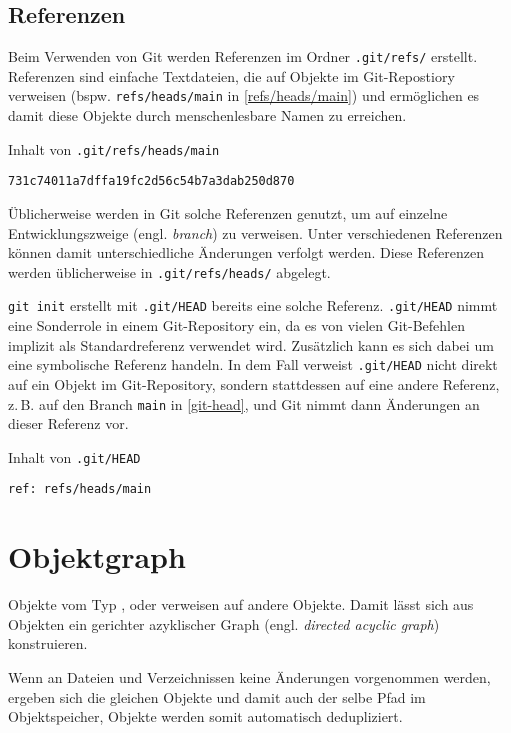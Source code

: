 \documentclass[
	nonacm,%
	screen,%
	sigplan,
]{acmart}
\begin{document}
\subsection{Referenzen}\label{ref}

\sloppy
Beim Verwenden von Git werden Referenzen im Ordner \texttt{.git/refs/} erstellt. Referenzen sind einfache Textdateien, die auf Objekte im Git-Repostiory verweisen (bspw. \texttt{refs/heads/main} in \autoref{refs/heads/main}) und ermöglichen es damit diese Objekte durch menschenlesbare Namen zu erreichen. \cite{git-references}

\begin{example}
	\caption{Inhalt von \texttt{.git/refs/heads/main}}%
	\label{refs/heads/main}%
	\centering
	\small
	\texttt{731c74011a7dffa19fc2d56c54b7a3dab250d870}
\end{example}

Üblicherweise werden in Git solche Referenzen genutzt, um auf einzelne Entwicklungszweige (engl. \emph{branch}) zu verweisen. Unter verschiedenen Referenzen können damit unterschiedliche Änderungen verfolgt werden. Diese Referenzen werden üblicherweise in \texttt{.git/refs/heads/} abgelegt.

\texttt{git init} erstellt mit \texttt{.git/HEAD} bereits eine solche Referenz. \texttt{.git/HEAD} nimmt eine Sonderrole in einem Git-Repository ein, da es von vielen Git-Befehlen implizit als Standardreferenz verwendet wird. Zusätzlich kann es sich dabei um eine symbolische Referenz handeln. In dem Fall verweist \texttt{.git/HEAD} nicht direkt auf ein Objekt im Git-Repository, sondern stattdessen auf eine andere Referenz, z.\,B. auf den Branch \texttt{main} in \autoref{git-head}, und Git nimmt dann Änderungen an dieser Referenz vor.

\begin{example}
	\caption{Inhalt von \texttt{.git/HEAD}}
	\label{git-head}%
	\centering
	\small
	\texttt{ref: refs/heads/main}
\end{example}

\section{Objektgraph}

Objekte vom Typ ,  oder  verweisen auf andere Objekte. Damit lässt sich aus Objekten ein gerichter azyklischer Graph (engl. \emph{directed acyclic graph}) konstruieren.

Wenn an Dateien und Verzeichnissen keine Änderungen vorgenommen werden, ergeben sich die gleichen Objekte und damit auch der selbe Pfad im Objektspeicher, Objekte werden somit automatisch dedupliziert.
\end{document}
